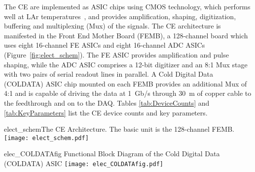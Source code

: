 The CE are implemented as ASIC chips using CMOS technology,
which performs well at LAr temperatures~\cite{ThornEtAl:CELAr},
and provides amplification, shaping, digitization, buffering and multiplexing (Mux) of the signals.
The CE architecture is manifested in the Front End Mother Board (FEMB),
a 128-channel board which uses eight 16-channel FE ASICs and eight 16-channel ADC ASICs
(Figure~\ref{fig:elect_schem}).
The FE ASIC provides amplification and pulse shaping, while
the ADC ASIC comprises a 12-bit digitizer
and an 8:1 Mux stage with two pairs of serial readout lines in parallel.
A Cold Digital Data (COLDATA) ASIC chip mounted on each FEMB provides an additional Mux of 4:1 and
is capable of driving the data at 1~Gb/s through 30~m of copper cable to the feedthrough and on to the DAQ. 
Tables \ref{tab:DeviceCounts} and \ref{tab:KeyParameters} list the CE device counts and key parameters.
\begin{cdrfigure}{elect_schem}{The CE Architecture. The basic unit is the 128-channel FEMB.}
\texttt{[image: elect\_schem.pdf]}
\end{cdrfigure}
\begin{cdrfigure}{elec_COLDATAfig}
{Functional Block Diagram of the Cold Digital Data (COLDATA) ASIC}
\texttt{[image: elec\_COLDATAfig.pdf]}
\end{cdrfigure}

